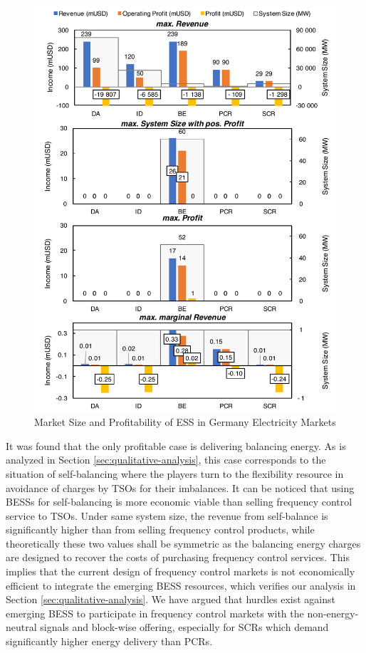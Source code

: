 \begin{figure}[h!]
	\centering
	\includegraphics[width=0.9\linewidth]{Figures/Germany_ESS}
	\caption{Market Size and Profitability of ESS in Germany Electricity Markets}
	\label{fig:germany-ess}
\end{figure}

It was found that the only profitable case is delivering balancing energy. As is analyzed in Section \ref{sec:qualitative-analysis}, this case corresponds to the situation of self-balancing where the players turn to the flexibility resource in avoidance of charges by TSOs for their imbalances. It can be noticed that using BESSs for self-balancing is more economic viable than selling frequency control service to TSOs. Under same system size, the revenue from self-balance is significantly higher than from selling frequency control products, while theoretically these two values shall be symmetric as the balancing energy charges are designed to recover the costs of purchasing frequency control services. This implies that the current design of frequency control markets is not economically efficient to integrate the emerging BESS resources, which verifies our analysis in Section \ref{sec:qualitative-analysis}. We have argued that hurdles exist against emerging BESS to participate in frequency control markets with the non-energy-neutral signals and block-wise offering, especially for SCRs which demand significantly higher energy delivery than PCRs.

